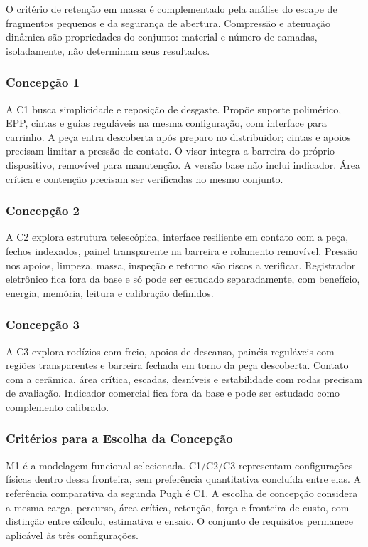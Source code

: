 O critério de retenção em massa é complementado pela análise do escape de fragmentos pequenos e da segurança de abertura. Compressão e atenuação dinâmica são propriedades do conjunto: material e número de camadas, isoladamente, não determinam seus resultados.



\subsubsection{Concepção 1}

A C1 busca simplicidade e reposição de desgaste. Propõe suporte polimérico, EPP, cintas e guias reguláveis na mesma configuração, com interface para carrinho. A peça entra descoberta após preparo no distribuidor; cintas e apoios precisam limitar a pressão de contato. O visor integra a barreira do próprio dispositivo, removível para manutenção. A versão base não inclui indicador. Área crítica e contenção precisam ser verificadas no mesmo conjunto.

\subsubsection{Concepção 2}

A C2 explora estrutura telescópica, interface resiliente em contato com a peça, fechos indexados, painel transparente na barreira e rolamento removível. Pressão nos apoios, limpeza, massa, inspeção e retorno são riscos a verificar. Registrador eletrônico fica fora da base e só pode ser estudado separadamente, com benefício, energia, memória, leitura e calibração definidos.

\subsubsection{Concepção 3}

A C3 explora rodízios com freio, apoios de descanso, painéis reguláveis com regiões transparentes e barreira fechada em torno da peça descoberta. Contato com a cerâmica, área crítica, escadas, desníveis e estabilidade com rodas precisam de avaliação. Indicador comercial fica fora da base e pode ser estudado como complemento calibrado.

\subsubsection{Critérios para a Escolha da Concepção}

M1 é a modelagem funcional selecionada. C1/C2/C3 representam configurações físicas dentro dessa fronteira, sem preferência quantitativa concluída entre elas. A referência comparativa da segunda Pugh é C1. A escolha de concepção considera a mesma carga, percurso, área crítica, retenção, força e fronteira de custo, com distinção entre cálculo, estimativa e ensaio. O conjunto de requisitos permanece aplicável às três configurações.

